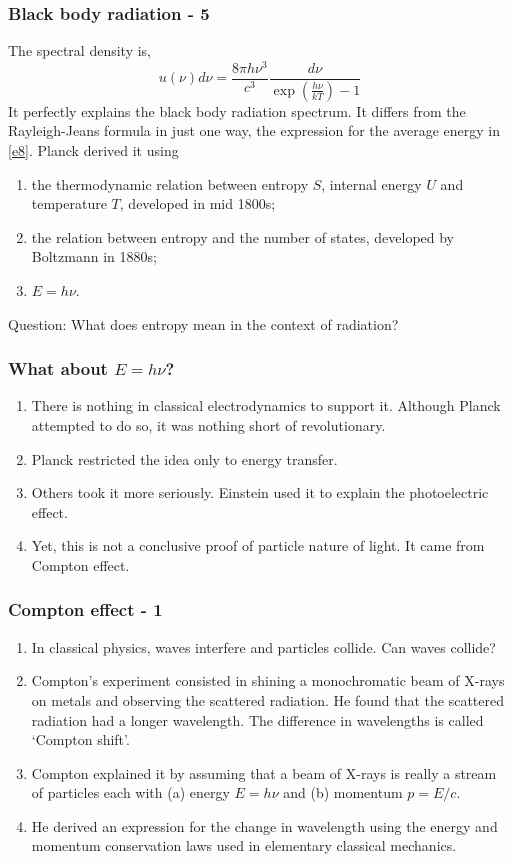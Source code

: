 \documentclass{beamer}
\begin{document}
\begin{frame}
\frametitle{Black body radiation - 5}
The spectral density is,
\begin{equation}\label{e9}
u(\nu)d\nu = 
   \frac{8\pi h\nu^3}{c^3}\frac{d\nu}{\exp\left(\frac{h\nu}{kT}\right) - 1}
\end{equation}
It perfectly explains the black body radiation spectrum. It differs from the
Rayleigh-Jeans formula in just one way, the expression for the average energy 
in \eqref{e8}. Planck derived it using 
\begin{enumerate}
\item the thermodynamic relation between entropy $S$, internal energy $U$ and
temperature $T$, developed in mid 1800s;
\item the relation between entropy and the number of states, developed by
Boltzmann in 1880s;
\item $E = h\nu$.
\end{enumerate}
Question: What does entropy mean in the context of radiation?
\end{frame}

\begin{frame}
\frametitle{What about $E = h\nu$?}
\begin{enumerate}
\item There is nothing in classical electrodynamics to support it. Although
Planck attempted to do so, it was nothing short of revolutionary.
\item Planck restricted the idea only to energy transfer. 
\item Others took it more seriously. Einstein used it to explain the 
photoelectric effect.
\item Yet, this is not a conclusive proof of particle nature of light. It
came from Compton effect.
\end{enumerate}
\end{frame}

\begin{frame}
\frametitle{Compton effect - 1}
\begin{enumerate}
\item In classical physics, waves interfere and particles collide. Can waves
collide?
\item Compton's experiment consisted in shining a monochromatic beam of X-rays
on metals and observing the scattered radiation. He found that the scattered
radiation had a longer wavelength. The difference in wavelengths is called
`Compton shift'.
\item Compton explained it by assuming that a beam of X-rays is really a stream
of particles each with (a) energy $E = h\nu$ and (b) momentum $p = E/c$.
\item He derived an expression for the change in wavelength using the energy 
and momentum conservation laws used in elementary classical mechanics.
\end{enumerate}
\end{frame}
\end{document}
